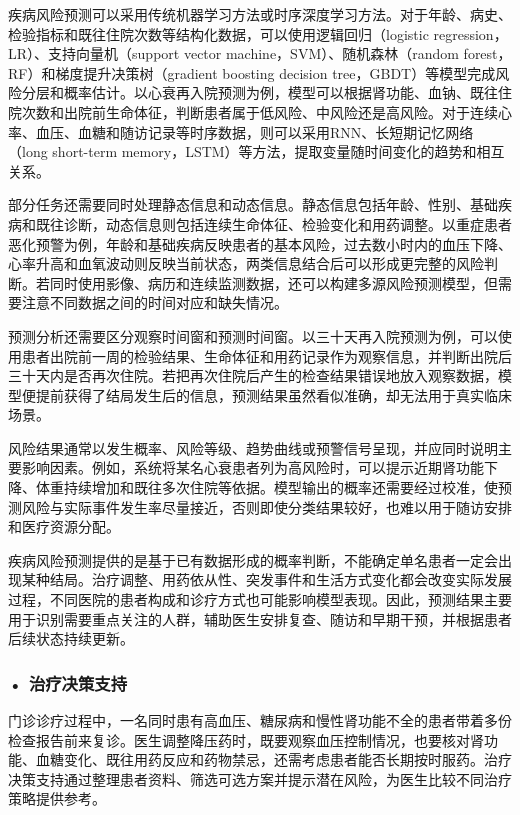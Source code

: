 疾病风险预测可以采用传统机器学习方法或时序深度学习方法。对于年龄、病史、检验指标和既往住院次数等结构化数据，可以使用逻辑回归（logistic regression，LR）、支持向量机（support vector machine，SVM）、随机森林（random forest，RF）和梯度提升决策树（gradient boosting decision tree，GBDT）等模型完成风险分层和概率估计。以心衰再入院预测为例，模型可以根据肾功能、血钠、既往住院次数和出院前生命体征，判断患者属于低风险、中风险还是高风险。对于连续心率、血压、血糖和随访记录等时序数据，则可以采用RNN、长短期记忆网络（long short-term memory，LSTM）等方法，提取变量随时间变化的趋势和相互关系。

部分任务还需要同时处理静态信息和动态信息。静态信息包括年龄、性别、基础疾病和既往诊断，动态信息则包括连续生命体征、检验变化和用药调整。以重症患者恶化预警为例，年龄和基础疾病反映患者的基本风险，过去数小时内的血压下降、心率升高和血氧波动则反映当前状态，两类信息结合后可以形成更完整的风险判断。若同时使用影像、病历和连续监测数据，还可以构建多源风险预测模型，但需要注意不同数据之间的时间对应和缺失情况。

预测分析还需要区分观察时间窗和预测时间窗。以三十天再入院预测为例，可以使用患者出院前一周的检验结果、生命体征和用药记录作为观察信息，并判断出院后三十天内是否再次住院。若把再次住院后产生的检查结果错误地放入观察数据，模型便提前获得了结局发生后的信息，预测结果虽然看似准确，却无法用于真实临床场景。

风险结果通常以发生概率、风险等级、趋势曲线或预警信号呈现，并应同时说明主要影响因素。例如，系统将某名心衰患者列为高风险时，可以提示近期肾功能下降、体重持续增加和既往多次住院等依据。模型输出的概率还需要经过校准，使预测风险与实际事件发生率尽量接近，否则即使分类结果较好，也难以用于随访安排和医疗资源分配。

疾病风险预测提供的是基于已有数据形成的概率判断，不能确定单名患者一定会出现某种结局。治疗调整、用药依从性、突发事件和生活方式变化都会改变实际发展过程，不同医院的患者构成和诊疗方式也可能影响模型表现。因此，预测结果主要用于识别需要重点关注的人群，辅助医生安排复查、随访和早期干预，并根据患者后续状态持续更新。


\subsubsection*{\textbf{• 治疗决策支持}}

门诊诊疗过程中，一名同时患有高血压、糖尿病和慢性肾功能不全的患者带着多份检查报告前来复诊。医生调整降压药时，既要观察血压控制情况，也要核对肾功能、血糖变化、既往用药反应和药物禁忌，还需考虑患者能否长期按时服药。治疗决策支持通过整理患者资料、筛选可选方案并提示潜在风险，为医生比较不同治疗策略提供参考。

